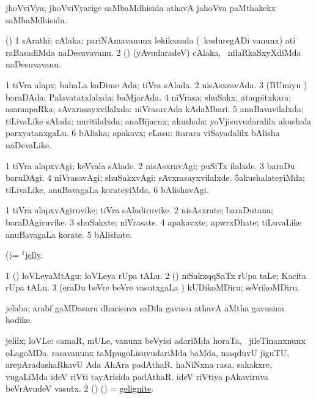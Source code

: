 \bentry
{}
\gl{\gu}
\bmng
j{ho}VviVya; j{ho}VviVyarige saMbaMdhisida athavA ja{ho}Vva paMthakekx saMbaMdhisida. 
\emng
\eentry

\bentry
{}
\gl{\nA}
\bmng
(\hA) 
\bnum
\num{1} sArathi; cAlaka; pariNAmavanunx lekikxsada (\kanmu\ kuduregADi \mo vanunx) ati raBasadiMda naDesuvavanu. 
\num{2} (\rUpa) (yAvudaradeV) cAlaka, \kanmu\ nilaRkaSxyXdiMda naDesuvavanu. 
\enum
\emng
\eentry

\bentry
{}
\gl{\gu}
\bmng
\bnum
\num{1} tiVra alapx; bahaLa kaDime Ada; tiVra sAlada. 
\num{2} nisAsxravAda. 
\num{3} (BUmiyu \vi) baraDAda; Palavatatxlalxda; baMjarAda. 
\num{4} niVrasa; shuSakx; ataqpitxkara; asamapaRka; sAvxrasayxvilalxda:  niVrasavAda kAdaMbari. 
\num{5} anuBavavilalxda; tiLivaLike sAlada; nuritilalxda; anaBijacnx; akushala:  yoVjisuvudaralilx akushala parxyatanxgaLu. 
\num{6} bAlisha; apakavx; eLasu:  itarara viSayadalilx bAlisha naDevaLike. 
\enum
\emng
\eentry

\bentry
{}
\gl{\kirxvi}
\bmng
\bnum
\num{1} tiVra alapxvAgi; keVvala sAlade. 
\num{2} nisAsxravAgi; puSiTx ilalxde. 
\num{3} baraDu baruDAgi. 
\num{4} niVrasavAgi; shuSakxvAgi; sAvxrasayxvilalxde. 
\num{5}akushalateyiMda; tiLivaLike, anuBavagaLa korateyiMda. 
\num{6} bAlishavAgi. 
\enum
\emng
\eentry

\bentry
{}
\gl{\nA}
\bmng
\bnum
\num{1} tiVra alapxvAgiruvike; tiVra sAladiruvike. 
\num{2} nisAsxrate; baraDutana; baraDAgiruvike. 
\num{3} shuSakxte; niVrasate. 
\num{4} apakavxte; apwrxDhate; tiLuvaLike anuBavagaLa korate. 
\num{5} bAlishate. 
\enum
\emng
\eentry

\bentry
{}
\gl{\nA}
\bmng
(\AmA)=  \hyperlink{jelly(1)}{$^1$jelly}. 
\emng
\eentry

\bentry
{}
\gl{\akirx}
\bmng
\bnum
\num{1} (\AmA) loVLeyaMtAgu; loVLeya rUpa tALu. 
\num{2} (\rUpa) niSakxqqSaTx rUpa taLe; Kacita rUpa tALu. 
\num{3} (eraDu beVre beVre vasutxgaLa \vi) kUDikoMDiru; seVrikoMDiru. 
\enum
\emng
\eentry

\bentry
{}
\gl{\nA}
\bmng
jelaba; arabf gaMDasaru dharisuva saDila gavusu athavA aMtha gavusina hodike. 
\emng
\eentry

\bentry
{}
\gl{\nA}
\bmng
\bnum
{} jelilx; loVLe: 
\banum
{} camaR, mULe, \mo vanunx beVyisi adariMda horaTa, \kanmu\ jileTinanxnunx oLagoMDa, rasavanunx taMpugoLisuvudariMda baMda, maqduvU jiguTU, arepAradashaRkavU Ada AhAra padAthaR. 
 haNiNxna rasa, sakakxre, \mo vugaLiMda ideV riVti tayArisida padAthaR. 
 ideV riVtiya pAkaviruva beVrAvudeV vasutx. 
\eanum
\numie
\num{2} (\birx) (\ashi) = \hyperref{kandict_g.pdf}{G}{gelignite}{gelignite}. 
\enum
\emng
\eentry

